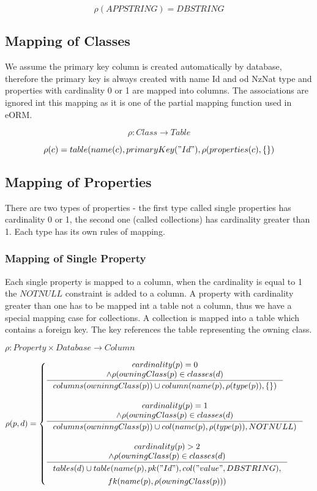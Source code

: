 \documentclass[11pt]{article}
\begin{document}
$$
\rho(APPSTRING) = DBSTRING
$$


\subsection{Mapping of Classes}
We assume the primary key column is created automatically by database, therefore the primary key is always created with name Id and od NzNat type and properties with cardinality 0 or 1 are mapped into columns. The associations are ignored int this mapping as it is one of the partial mapping function used in eORM.

$$
\rho : Class \rightarrow Table
$$

$$
\rho(c) = table(name(c), primaryKey("Id"), \rho(properties(c), \{ \})
$$

\subsection{Mapping of Properties}
There are two types of properties - the first type called single properties has cardinality 0 or 1, the second one (called collections) has cardinality greater than 1. Each type has its own rules of mapping.

\subsubsection{Mapping of Single Property}
Each single property is mapped to a column, when the cardinality is equal to 1 the $NOTNULL$ constraint is added to a column. A property with cardinality greater than one has to be mapped int a table not a column, thus we have a special mapping case for collections. A collection is mapped into a table which contains a foreign key. The key references the table representing the owning class.



$
\rho : Property \times Database \rightarrow Column 
$

$\rho(p, d) = \begin{cases}
 \inference{cardinality(p) = 0 \\ \wedge \rho(owningClass(p) \in classes(d)}{columns(owninngClass(p)) \cup column(name(p), \rho(type(p)), \{ \})} \\ \\
 
 \inference{cardinality(p) = 1 \\ \wedge \rho(owningClass(p) \in classes(d)}{columns(owninngClass(p)) \cup col(name(p), \rho(type(p)), NOTNULL)} \\ \\
 
 \inference{cardinality(p) > 2 \\ \wedge \rho(owningClass(p) \in classes(d)}{\begin{gathered} tables(d) \cup table(name(p), pk("Id"), col("value", DBSTRING), \\ fk(name(p), \rho(owningClass(p))) \end{gathered}}
 \end{cases}$
\end{document}
